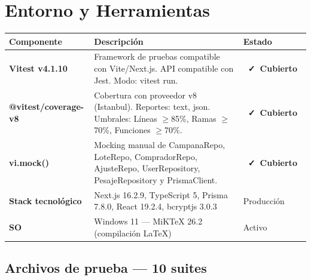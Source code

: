 \documentclass[12pt, a4paper]{article}
\newcommand{\badgeCovered}{\colorbox{CSuccessBg}{\color{CSuccess}\small\bfseries\ \faCheck\ Cubierto\ }}
\newcommand{\code}[1]{\colorbox{CCodeBg}{\color{CCode}\ttfamily\small #1}}
\begin{document}
\section{Entorno y Herramientas}

\begin{center}
\renewcommand{\arraystretch}{1.5}
\begin{tabularx}{\textwidth}{>{\bfseries}p{3.5cm} X >{\centering\arraybackslash}p{2.2cm}}
  \rowcolor{CRowAlt}
  \bfseries Componente & \bfseries Descripción & \bfseries Estado \\
  \midrule
  Vitest v4.1.10 & Framework de pruebas compatible con Vite/Next.js. API compatible con Jest. Modo: \code{vitest run}. & \badgeCovered \\
  \rowcolor{CBg}
  @vitest/coverage-v8 & Cobertura con proveedor v8 (Istanbul). Reportes: text, json. Umbrales: L\'ineas $\geq$85\%, Ramas $\geq$70\%, Funciones $\geq$70\%. & \badgeCovered \\
  vi.mock() & Mocking manual de \code{CampanaRepo}, \code{LoteRepo}, \code{CompradorRepo}, \code{AjusteRepo}, \code{UserRepository}, \code{PesajeRepository} y \code{PrismaClient}. & \badgeCovered \\
  \rowcolor{CBg}
  Stack tecnológico & Next.js 16.2.9, TypeScript 5, Prisma 7.8.0, React 19.2.4, bcryptjs 3.0.3 & Producción \\
  SO & Windows 11 --- MiKTeX 26.2 (compilación LaTeX) & Activo \\
  \bottomrule
\end{tabularx}
\end{center}

\subsection{Archivos de prueba — 10 suites}
\end{document}
